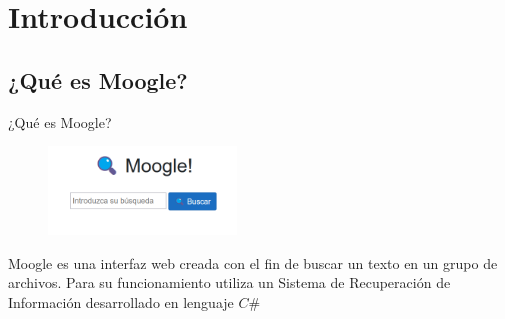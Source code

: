 \section{Introducción}\label{intro}
\subsection{¿Qué es Moogle?}
\begin{frame}
    \centering
    {\large ¿Qué es Moogle?\par}
    \vspace{.5cm}

    \pause
    \begin{figure}
    \includegraphics[width=5cm]{sections/moog.png}
    \end{figure}
    {\large Moogle es una interfaz web creada con el fin de buscar
    un texto en un grupo de archivos. Para su funcionamiento
    utiliza un Sistema de Recuperación de Información
    desarrollado en lenguaje $C\#$}   


\end{frame}